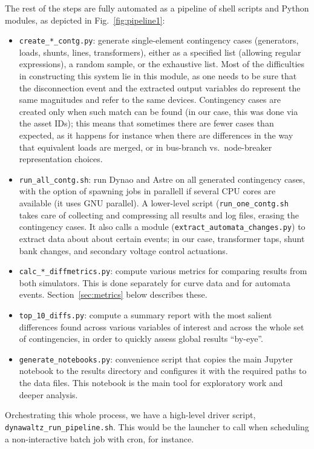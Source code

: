\documentclass[conference]{IEEEtran}
\newcommand{\Dynawo}{Dyna\textomega o\xspace} %
\newcommand{\code}[1]{\texttt{#1}}
\begin{document}
The rest of the steps are fully automated as a pipeline of shell scripts and
Python modules, as depicted in Fig.~\ref{fig:pipeline1}:
\begin{itemize}
\item \code{create\_*\_contg.py}: generate single-element contingency cases
  (generators, loads, shunts, lines, transformers), either as a specified list
  (allowing regular expressions), a random sample, or the exhaustive list.  Most
  of the difficulties in constructing this system lie in this module, as one
  needs to be sure that the disconnection event and the extracted output
  variables do represent the same magnitudes and refer to the same
  devices. Contingency cases are created only when such match can be found (in
  our case, this was done via the asset IDs); this means that sometimes there
  are fewer cases than expected, as it happens for instance when there are
  differences in the way that equivalent loads are merged, or in bus-branch
  vs.\ node-breaker representation choices.
\item \code{run\_all\_contg.sh}: run \Dynawo and Astre on all generated
  contingency cases, with the option of spawning jobs in parallell if several
  CPU cores are available (it uses GNU parallel).  A lower-level script
  (\code{run\_one\_contg.sh} takes care of collecting and compressing all
  results and log files, erasing the contingency cases. It also calls a module
  (\code{extract\_automata\_changes.py}) to extract data about about certain
  events; in our case, transformer taps, shunt bank changes, and secondary
  voltage control actuations.
\item \code{calc\_*\_diffmetrics.py}: compute various metrics for
  comparing results from both simulators. This is done separately for
  curve data and for automata events. Section~\ref{sec:metrics} below
  describes these.
\item \code{top\_10\_diffs.py}: compute a summary report with the most salient
  differences found across various variables of interest and across the whole
  set of contingencies, in order to quickly assess global results ``by-eye''.
\item \code{generate\_notebooks.py}: convenience script that copies the main
  Jupyter notebook to the results directory and configures it with the required
  paths to the data files. This notebook is the main tool for exploratory work
  and deeper analysis.
\end{itemize}
Orchestrating this whole process, we have a high-level driver script,
\code{dynawaltz\_run\_pipeline.sh}. This would be the launcher to call when
scheduling a non-interactive batch job with cron, for instance.
\end{document}
